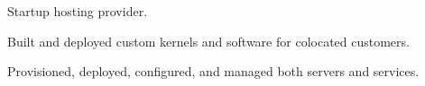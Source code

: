 \item Startup hosting provider.
\item Built and deployed custom kernels and software for colocated customers.
\item Provisioned, deployed, configured, and managed both servers and services.
